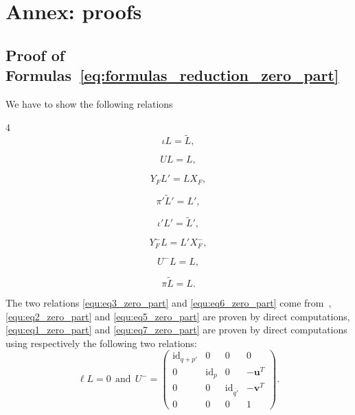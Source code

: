\documentclass[10pt]{article}
\newenvironment{changemargin}[2]{\begin{list}{}{%
      \setlength{\topsep}{0pt}%
      \setlength{\leftmargin}{0pt}%
      \setlength{\rightmargin}{0pt}%
      \setlength{\listparindent}{\parindent}%
      \setlength{\itemindent}{\parindent}%
      \setlength{\parsep}{0pt plus 1pt}%
      \addtolength{\leftmargin}{#1}%
      \addtolength{\rightmargin}{#2}%
    }\item }{\end{list}}
\newcommand\g[1]{\textbf{#1}}
\newcommand\id[1]{\text{id}_{#1}}
\begin{document}
\section{Annex: proofs}\label{sec:annex}

\subsection{Proof of Formulas~\ref{eq:formulas_reduction_zero_part}}
\label{sec:proofs_reduction_zero_part}

We have to show the following relations

\begin{changemargin}{-1.8cm}{0cm}
  \begin{multicols}{4}
    \begin{equation}\label{equ:eq1_zero_part}
      \iota L=\tilde{L},
    \end{equation}
    
    \begin{equation}\label{equ:eq2_zero_part}
      UL=L,
    \end{equation}
    
    \begin{equation}\label{equ:eq3_zero_part}
      Y_FL'=LX_F,
    \end{equation}
    
    \begin{equation}\label{equ:eq4_zero_part}
      \pi'\tilde{L}'=L',
    \end{equation}
    
    \begin{equation}\label{equ:eq5_zero_part}
      \iota'L'=\tilde{L}',
    \end{equation}
    
    \begin{equation}\label{equ:eq6_zero_part}
      Y_F^-L=L'X_F^-,
    \end{equation}
    
    \begin{equation}\label{equ:eq7_zero_part}
      U^-L=L,
    \end{equation}
    
    \begin{equation}\label{equ:eq8_zero_part}
      \pi\tilde{L}=L.
    \end{equation}
  \end{multicols}
\end{changemargin}

The two relations \eqref{equ:eq3_zero_part} and \eqref{equ:eq6_zero_part}
come from~\cite{cluzeau2011constructive}, \eqref{equ:eq2_zero_part} and
\eqref{equ:eq5_zero_part} are proven by direct computations,
\eqref{equ:eq1_zero_part} and \eqref{equ:eq7_zero_part} are proven by
direct computations using respectively the following two relations:
\[\ell L=0\ \ \text{and}\ \
U^-=\begin{pmatrix}
\id{q+p'} & 0 & 0 & 0\\
0 & \id{p} & 0 & -\g{u}^T\\
0 & 0 & \id{\overline{q'}} & -\g{v}^T\\
0 & 0 & 0 & 1
\end{pmatrix}.\]
\end{document}
